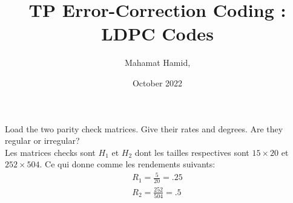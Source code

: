 \documentclass[12pt,a4paper]{article}
\title{TP  Error-Correction Coding : LDPC Codes}
\author{Mahamat Hamid, }
\date{October 2022}
\begin{document}
	\maketitle
\begin{question}
	Load the two parity check matrices. Give their rates and degrees. Are they regular or irregular?\\
	Les matrices checks sont $H_1$ et $H_2$ dont les tailles respectives sont $15\times 20$ et $252\times 504$. Ce qui donne comme les rendements suivants:
	\begin{align*}
		R_1=\frac{5}{20}=\num{.25}\\
		R_2=\frac{252}{504}=\num{.5}
	\end{align*}
	
\end{question}
\end{document}
